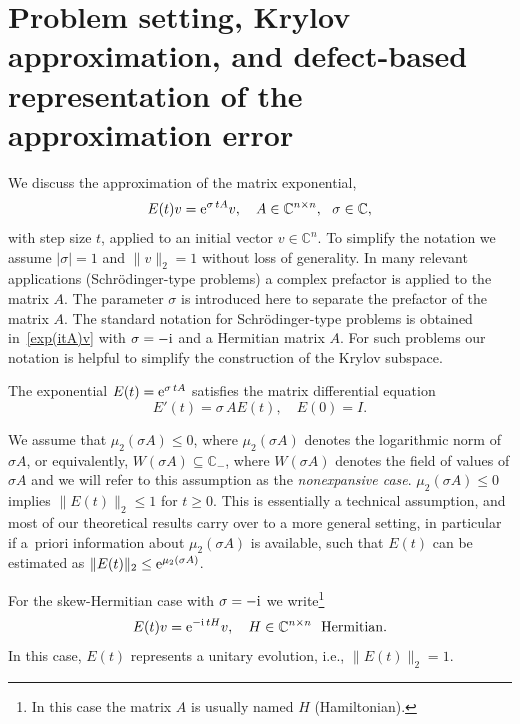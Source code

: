 \documentclass[smallextended]{svjour3pre}%
\numberwithin{equation}{section}
\numberwithin{figure}{section}
\numberwithin{table}{section}
\newcommand{\C}{\mathbb C}%
\newcommand\tjnew[1]{{#1}}
\newcommand{\ee}{{\rm e}}
\newcommand{\ii}{{\rm i}}
\newcommand\sca{\sigma}
\newcommand\Opgen{A}
\begin{document}
\section{Problem setting, Krylov approximation, and defect-based representation of the approximation error}
\label{sec:problem}


\tjnew{We discuss the approximation of the matrix exponential,
\begin{equation}\label{exp(itA)v}
E(t)v = \ee^{\sca\,t \Opgen} v, \quad \Opgen \in \C^{n\times n},~~\sca\in\C,
\end{equation}
with step size $ t $, applied to an initial vector $ v \in \C^n $.
To simplify the notation we assume $ |\sca|=1 $ and $ \|v\|_2=1 $ without loss of generality.
In many relevant applications (Schr{\"o}dinger-type problems) a complex prefactor is applied to the matrix $A$.
The parameter $\sca$ is introduced here to separate the prefactor of the
matrix $A$.
The standard notation for Schr{\"o}dinger-type problems
is obtained in~\eqref{exp(itA)v} with $\sca=-\ii$ and a Hermitian matrix $A$.
For such problems our notation is helpful to simplify the construction
of the Krylov subspace.


The exponential $ E(t)=\ee^{\sca\,t \Opgen} $ satisfies the
matrix differential equation
\begin{equation*}
 E'(t) = \sca\,\Opgen E(t),\quad E(0)=I.
\end{equation*}

We assume that $\mu_2(\sigma A)\leq 0$, where $\mu_2(\sigma A)$ denotes the logarithmic norm of $\sigma A$,
or equivalently, $W(\sigma A)\subseteq \C_-$, where $W(\sigma A)$ denotes the field of values of $\sigma A$
and we will refer to this assumption as the \emph{nonexpansive case}.
$\mu_2(\sigma A)\leq 0$ implies $\|E(t)\|_2\leq 1$ for $t\geq 0$.
This is essentially a technical assumption, and most of our theoretical results carry over to a more general setting,
in particular if a~priori information about $\mu_2(\sigma A)$ is available, such that
$E(t)$ can be estimated as $\|E(t)\|_2  \leq \ee^{\mu_2(\sigma A)}$.

For the skew-Hermitian case
with $ \sca = -\ii $ we
write\footnote{In this case the matrix $ A $ is usually named $ H $ (Hamiltonian).}
\begin{equation*}
E(t)v = \ee^{-\ii\,t H} v, \quad H \in \C^{n\times n}~~\text{Hermitian.}
\end{equation*}
In this case, $ E(t) $ represents a unitary evolution,
i.e., $ \|E(t)\|_2 = 1$.
}
\end{document}

